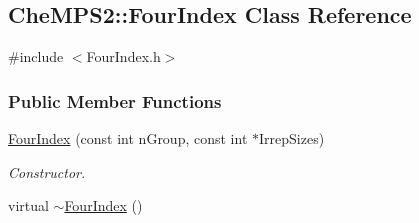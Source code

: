 \hypertarget{classCheMPS2_1_1FourIndex}{\subsection{Che\-M\-P\-S2\-:\-:Four\-Index Class Reference}
\label{classCheMPS2_1_1FourIndex}
}


{\ttfamily \#include $<$Four\-Index.\-h$>$}

\subsubsection*{Public Member Functions}
\begin{DoxyCompactItemize}
\item 
\hyperlink{classCheMPS2_1_1FourIndex_a552ebf0c200713acdd4ce8b5222bc6ac}{Four\-Index} (const int n\-Group, const int $\ast$Irrep\-Sizes)
\begin{DoxyCompactList}\small\item\em Constructor. \end{DoxyCompactList}\item 
\hypertarget{classCheMPS2_1_1FourIndex_a4988b7745b0ec4d5f86c4af89ba20430}{virtual \hyperlink{classCheMPS2_1_1FourIndex_a4988b7745b0ec4d5f86c4af89ba20430}{$\sim$\-Four\-Index} ()}\label{classCheMPS2_1_1FourIndex_a4988b7745b0ec4d5f86c4af89ba20430}


\end{DoxyCompactItemize}
